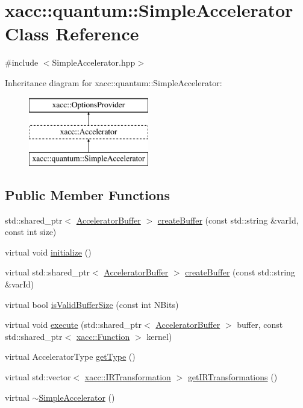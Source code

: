 \hypertarget{a00080}{}\section{xacc\+:\+:quantum\+:\+:Simple\+Accelerator Class Reference}
\label{a00080}


{\ttfamily \#include $<$Simple\+Accelerator.\+hpp$>$}

Inheritance diagram for xacc\+:\+:quantum\+:\+:Simple\+Accelerator\+:\begin{figure}[H]
\begin{center}
\leavevmode
\includegraphics[height=3.000000cm]{a00080}
\end{center}
\end{figure}
\subsection*{Public Member Functions}
\begin{DoxyCompactItemize}
\item 
std\+::shared\+\_\+ptr$<$ \hyperlink{a00013}{Accelerator\+Buffer} $>$ \hyperlink{a00080_adb9393692e9f484df241aa5d014030d1}{create\+Buffer} (const std\+::string \&var\+Id, const int size)
\item 
virtual void \hyperlink{a00080_a392e3b30523f5f681127e7e98887108c}{initialize} ()
\item 
virtual std\+::shared\+\_\+ptr$<$ \hyperlink{a00013}{Accelerator\+Buffer} $>$ \hyperlink{a00080_a46445d77d4b8ad2689571d0db6604380}{create\+Buffer} (const std\+::string \&var\+Id)
\item 
virtual bool \hyperlink{a00080_a60b9db2d6aed235857c45413a070338e}{is\+Valid\+Buffer\+Size} (const int N\+Bits)
\item 
virtual void \hyperlink{a00080_a3089b15fbbaa83abf2941bd3b8d2d3c6}{execute} (std\+::shared\+\_\+ptr$<$ \hyperlink{a00013}{Accelerator\+Buffer} $>$ buffer, const std\+::shared\+\_\+ptr$<$ \hyperlink{a00039}{xacc\+::\+Function} $>$ kernel)
\item 
virtual Accelerator\+Type \hyperlink{a00080_ad76eeb0bbd7de21aad5bd20d20970a98}{get\+Type} ()
\item 
virtual std\+::vector$<$ \hyperlink{a00052}{xacc\+::\+I\+R\+Transformation} $>$ \hyperlink{a00080_afc49c9e7973ba6c6ff9761c36198323d}{get\+I\+R\+Transformations} ()
\item 
virtual \hyperlink{a00080_a7ff286def924fafdff2066d12858e60c}{$\sim$\+Simple\+Accelerator} ()
\end{DoxyCompactItemize}
